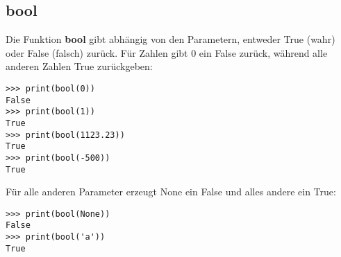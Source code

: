 \subsection*{bool}

Die Funktion \textbf{bool} gibt abhängig von den Parametern, entweder True (wahr) oder False (falsch) zurück. Für Zahlen gibt 0 ein False zurück, während alle anderen Zahlen True zurückgeben:

\begin{Verbatim}[frame=single]
>>> print(bool(0))
False
>>> print(bool(1))
True
>>> print(bool(1123.23))
True
>>> print(bool(-500))
True
\end{Verbatim}

Für alle anderen Parameter erzeugt None ein False und alles andere ein True:

\begin{Verbatim}[frame=single]
>>> print(bool(None))
False
>>> print(bool('a'))
True
\end{Verbatim}





